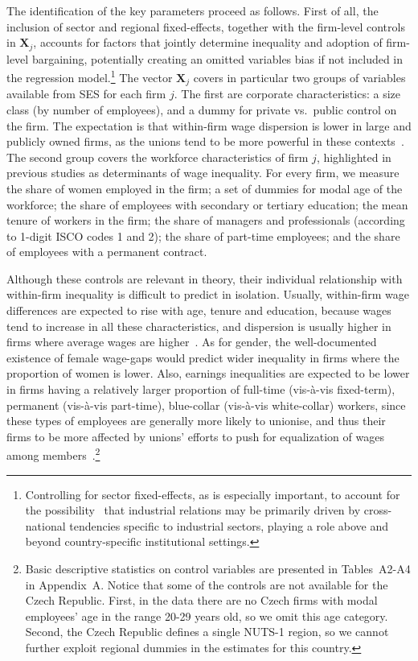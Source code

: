 \documentclass[12pt]{article}
\begin{document}
The identification of the key parameters proceed as follows. First of all, the inclusion of sector and regional fixed-effects, together with the firm-level controls in $\bm{X}_j$, accounts for factors that jointly determine inequality and adoption of firm-level bargaining, potentially creating an omitted variables bias if not included in the regression model.\footnote{Controlling for sector fixed-effects, as is especially important, to account for the possibility~\citep[put forward in][]{bechter2012sectors,hassel2014paradox} that industrial relations may be primarily driven by cross-national tendencies specific to industrial sectors, playing a role above and beyond country-specific institutional settings.} The vector $\bm{X}_j$ covers in particular two groups of variables available from SES for each firm $j$. The first are corporate characteristics: a size class (by number of employees), and a dummy for private vs.\ public control on the firm. The expectation is that within-firm wage dispersion is lower in large and publicly owned firms, as the unions tend to be more powerful in these contexts~\citep{canaldominguez.gutierrez.2004}. The second group covers the workforce characteristics of firm $j$, highlighted in previous studies as determinants of wage inequality. For every firm, we measure the share of women employed in the firm; a set of dummies for modal age of the workforce; the share of employees with secondary or tertiary education; the mean tenure of workers in the firm; the share of managers and professionals (according to 1-digit ISCO codes 1 and 2); the share of part-time employees; and the share of employees with a permanent contract. 

Although these controls are relevant in theory, their individual relationship with within-firm inequality is difficult to predict in isolation. Usually, within-firm wage differences are expected to rise with age, tenure and education, because wages tend to increase in all these characteristics, and dispersion is usually higher in firms where average wages are higher~\citep{canaldominguez.gutierrez.2004}. As for gender, the well-documented existence of female wage-gaps would predict wider inequality in firms where the proportion of women is lower. Also, earnings inequalities are expected to be lower in firms having a relatively larger proportion of full-time (vis-à-vis fixed-term), permanent (vis-à-vis part-time), blue-collar (vis-à-vis white-collar) workers, since these types of employees are generally more likely to unionise, and thus their firms to be more affected by unions' efforts to push for equalization of wages among members~\citep{canaldominguez.gutierrez.2004}.\footnote{Basic descriptive statistics on control variables are presented in Tables~A2-A4 in Appendix~A. Notice that some of the controls are not available for the Czech Republic. First, in the data there are no Czech firms with modal employees' age in the range 20-29 years old, so we omit this age category. Second, the Czech Republic defines a single NUTS-1 region, so we cannot further exploit regional dummies in the estimates for this country.}
\end{document}
